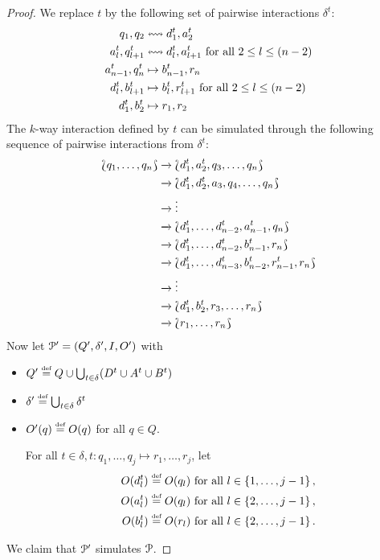 \begin{proof}
	We replace $t$ by the following set of pairwise interactions $\delta^t$:
	\begin{align*}
		q_1, q_2 & \leftrightsquigarrow  d^t_{1}, a^t_{2} \\
		a^t_{l}, q^t_{l+1} & \leftrightsquigarrow  d^t_{l}, a^t_{l+1} \text{ for all } 2 \leq l \leq (n-2) \\
		a^t_{n-1}, q^t_{n} & \mapsto b^t_{n-1}, r_{n} \\
		d^t_l, b^t_{l+1} & \mapsto b^t_l, r^t_{l+1}  \text{ for all } 2 \leq l \leq (n-2) \\
		d^t_1, b^t_2 & \mapsto r_1, r_2
	\end{align*}
	The $k$-way interaction defined by $t$ can be simulated through the following 
	sequence of pairwise interactions from $\delta^t$:
	\begin{align*}
	 \Lbag q_1, \ldots, q_n\Rbag & \xrightarrow{} \Lbag d^t_1, a^t_2, q_3, \ldots, q_n\Rbag \\
	                             & \xrightarrow{} \Lbag d^t_1, d^t_2, a_3, q_4, \ldots, q_n\Rbag \\
	                             & \xrightarrow{} \vdots \\
	                             & \xrightarrow{} \Lbag d^t_1, \ldots, d^t_{n-2}, a^t_{n-1}, q_n\Rbag \\
	                             & \xrightarrow{} \Lbag d^t_1, \ldots, d^t_{n-2}, b^t_{n-1}, r_n\Rbag \\
	                             & \xrightarrow{} \Lbag d^t_1, \ldots, d^t_{n-3}, b^t_{n-2}, r^t_{n-1}, r_n\Rbag \\
	                             & \xrightarrow{} \vdots \\
	                             & \xrightarrow{} \Lbag d^t_1, b^t_2, r_3, \ldots, r_n\Rbag \\
	                             & \xrightarrow{} \Lbag r_1, \ldots, r_n\Rbag
	\end{align*}
	Now let $\mathcal{P}' =(Q', \delta', I, O')$ with
	\begin{itemize}
		\item $Q' \stackrel{\scriptscriptstyle\text{def}}{=} Q \cup \bigcup_{t \in \delta} (D^t \cup A^t \cup B^t)$
		\item $\delta' \stackrel{\scriptscriptstyle\text{def}}{=} \bigcup_{t \in \delta} \delta^t$
		\item $O'(q) \stackrel{\scriptscriptstyle\text{def}}{=} O(q)$ for all $q \in Q$.

		      For all 
		      $t \in \delta, t \colon q_1, \ldots, q_j \mapsto r_1, \ldots, r_j$, let
		      \begin{align*}
		      O(d^t_l) & \stackrel{\scriptscriptstyle\text{def}}{=} O(q_l) \text{ for all } l \in \left\{1, \ldots, j-1\right\}, \\
		      O(a^t_l) & \stackrel{\scriptscriptstyle\text{def}}{=} O(q_l) \text{ for all } l \in \left\{2, \ldots, j-1\right\}, \\
		      O(b^t_l) & \stackrel{\scriptscriptstyle\text{def}}{=} O(r_l) \text{ for all } l \in \left\{2, \ldots, j-1\right\}.	      
		      \end{align*}
	\end{itemize}
	We claim that $\mathcal{P}'$ simulates $\mathcal{P}$.
\end{proof}